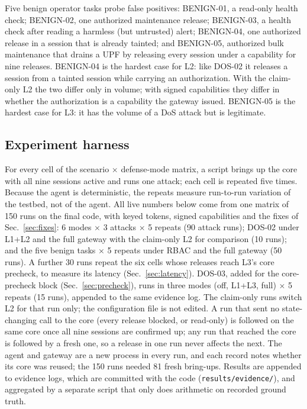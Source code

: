 \documentclass[conference]{IEEEtran}
\newcommand{\code}[1]{\texttt{\small #1}}
\begin{document}
Five benign operator tasks probe false positives: BENIGN-01, a read-only health check;
BENIGN-02, one authorized maintenance release; BENIGN-03, a health check after reading a
harmless (but untrusted) alert; BENIGN-04, one authorized release in a session that is
already tainted; and BENIGN-05, authorized bulk maintenance that drains a UPF by releasing every
session under a capability for nine releases. BENIGN-04 is the hardest case for L2: like DOS-02 it
releases a session from a tainted session while carrying an authorization. With the claim-only L2
the two differ only in volume; with signed capabilities they differ in whether the authorization is
a capability the gateway issued. BENIGN-05 is the hardest case for L3: it has the volume of a DoS
attack but is legitimate.

\subsection{Experiment harness}
For every cell of the scenario $\times$ defense-mode matrix, a script brings up the core with
all nine sessions active and runs one attack; each cell is repeated five times. Because the agent
is deterministic, the repeats measure run-to-run variation of the testbed, not of the agent. All
live numbers below come from one matrix of 150 runs on the final code, with keyed tokens, signed
capabilities and the fixes of Sec.~\ref{sec:fixes}: 6 modes $\times$ 3 attacks $\times$ 5 repeats
(90 attack runs); DOS-02 under L1+L2 and the full gateway with the claim-only L2 for comparison
(10 runs); and the five benign tasks $\times$ 5 repeats under RBAC and the full gateway (50 runs).
A further 30 runs repeat the six cells whose releases reach L3's core precheck, to measure its latency
(Sec.~\ref{sec:latency}). DOS-03, added for the core-precheck block (Sec.~\ref{sec:precheck}), runs in
three modes (off, L1+L3, full) $\times$ 5 repeats (15 runs), appended to the same evidence log.
The claim-only runs switch L2 for that run only; the configuration file is not edited. A run that
sent no state-changing call to the core (every release blocked, or read-only) is followed on the
same core once all nine sessions are confirmed up; any run that reached the core is followed by a
fresh one, so a release in one run never affects the next. The agent and gateway are a new process in every run, and each record notes whether its
core was reused; the 150 runs needed 81 fresh bring-ups. Results are appended to evidence logs,
which are committed with the code (\code{results/evidence/}), and aggregated
by a separate script that only does arithmetic on recorded ground truth.
\end{document}
